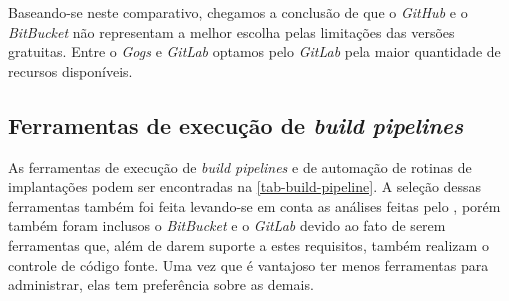 \documentclass[
12pt,				%
openright,			%
oneside,			%
a4paper,			%
english,			%
french,				%
spanish,			%
brazil,				%
]{abntex2}
\begin{document}
Baseando-se neste comparativo, chegamos a conclusão de que o \textit{GitHub} e o \textit{BitBucket} não representam a melhor escolha pelas limitações das versões gratuitas. Entre o \textit{Gogs} e \textit{GitLab} optamos pelo \textit{GitLab} pela maior quantidade de recursos disponíveis.

\subsection{Ferramentas de execução de \textit{build pipelines}}

As ferramentas de execução de \textit{build pipelines} e de automação de rotinas de implantações podem ser encontradas na \autoref{tab-build-pipeline}. A seleção dessas ferramentas também foi feita levando-se em conta as análises feitas pelo , porém também foram inclusos o \textit{BitBucket} e o \textit{GitLab} devido ao fato de serem ferramentas que, além de darem suporte a estes requisitos, também realizam o controle de código fonte. Uma vez que é vantajoso ter menos ferramentas para administrar, elas tem preferência sobre as demais.
\end{document}
